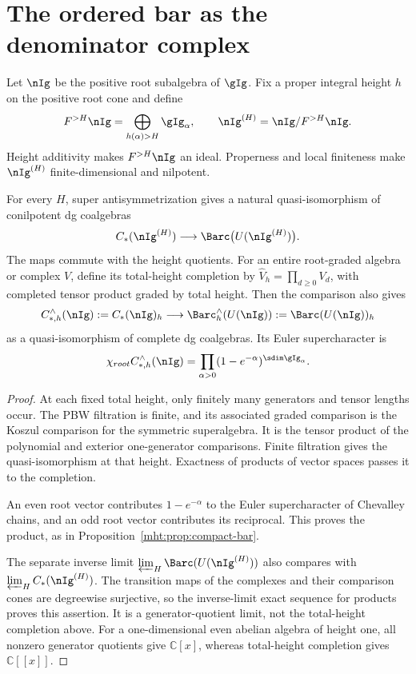 \chapter{The ordered bar as the denominator complex}
Let $\nIg$ be the positive root subalgebra of $\gIg$. Fix a proper integral height $h$ on the positive root cone and define
\[
 F^{>H}\nIg=\bigoplus_{h(\alpha)>H}\gIg_\alpha,
 \qquad
 \nIg^{(H)}=\nIg/F^{>H}\nIg.
\]
Height additivity makes $F^{>H}\nIg$ an ideal. Properness and local finiteness make $\nIg^{(H)}$ finite-dimensional and nilpotent.

\begin{theorem}
For every $H$, super antisymmetrization gives a natural quasi-isomorphism of conilpotent dg coalgebras
\[
 C_*(\nIg^{(H)})\longrightarrow\Barc\bigl(U(\nIg^{(H)})\bigr).
\]
The maps commute with the height quotients.
For an entire root-graded algebra or complex $V$, define its total-height completion by
$\widehat V_h=\prod_{d\ge0}V_d$, with completed tensor product graded by total height.
Then the comparison also gives
\[
 C_{*,h}^{\wedge}(\nIg):=\widehat{C_*(\nIg)}_h
 \longrightarrow
 \Barc_h^{\wedge}(U(\nIg)):=\widehat{\Barc(U(\nIg))}_h
\]
as a quasi-isomorphism of complete dg coalgebras.
Its Euler supercharacter is
\[
 \chi_{\mathrm{root}}C_{*,h}^{\wedge}(\nIg)
 =\prod_{\alpha>0}(1-e^{-\alpha})^{\sdim\gIg_\alpha}.
\]
\end{theorem}
\begin{proof}
At each fixed total height, only finitely many generators and tensor lengths occur.
The PBW filtration is finite, and its associated graded comparison is the Koszul comparison for the symmetric superalgebra.
It is the tensor product of the polynomial and exterior one-generator comparisons.
Finite filtration gives the quasi-isomorphism at that height. Exactness of products of vector spaces passes it to the completion.

An even root vector contributes $1-e^{-\alpha}$ to the Euler supercharacter of Chevalley chains, and an odd root vector contributes its reciprocal.
This proves the product, as in Proposition~\ref{mht:prop:compact-bar}.

The separate inverse limit $\varprojlim_H\Barc(U(\nIg^{(H)}))$ also compares with $\varprojlim_HC_*(\nIg^{(H)})$.
The transition maps of the complexes and their comparison cones are degreewise surjective, so the inverse-limit exact sequence for products proves this assertion.
It is a generator-quotient limit, not the total-height completion above.
For a one-dimensional even abelian algebra of height one, all nonzero generator quotients give $\mathbb C[x]$, whereas total-height completion gives $\mathbb C[[x]]$.
\end{proof}

